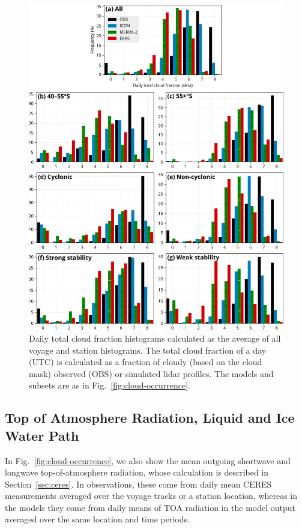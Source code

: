 \documentclass[draft]{agujournal2019}
\begin{document}
\begin{figure}[p!]
\centering
\includegraphics[width=\textwidth]{img/clt_hist_rev1.pdf}
\caption{
Daily total cloud fraction histograms calculated as the average of all voyage and station histograms. The total cloud fraction of a day (UTC) is calculated as a fraction of cloudy (based on the cloud mask) observed (OBS) or simulated lidar profiles. The models and subsets are as in Fig.~\ref{fig:cloud-occurrence}.
}
\label{fig:cloud-cover}
\end{figure}

\subsection{Top of Atmosphere Radiation, Liquid and Ice Water Path}

In Fig.~\ref{fig:cloud-occurrence}, we also show the mean outgoing shortwave and longwave top-of-atmosphere radiation, whose calculation is described in Section~\ref{sec:ceres}. In observations, these come from daily mean CERES measurements averaged over the voyage tracks or a station location, whereas in the models they come from daily means of TOA radiation in the model output averaged over the same location and time periods.
\end{document}
